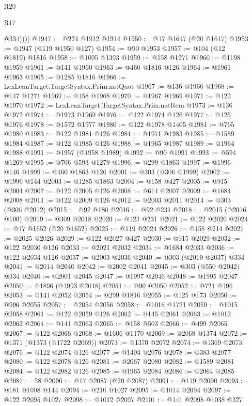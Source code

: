 \begin{lexlean}{R20}
\begin{lexlean}{R17}
\begin{coremodule}
{{{{{{{{{{{{{{{{{{{{{{{{{{{{{{{{{{{{{{{{{{{{{{{{{{{{{{{{{{{{{{{{{{{{{{{{{{{{{{{{{{{{{{{{{{{{{{{{{{{{{{{{{{{            @334))))
@1947 := @224 @1912 @1914
@1950 := @17 @1647 (@20 @1647)
@1953 := @1947 (@119 @1950 @127)
@1954 := @90 @1953
@1957 := @104 (@12 @1819) @1816
@1958 := @1005 @1393
@1959 := @158 @1271
@1960 := @1198 @1959
@1961 := @141 @1960
@1963 := @460 @1816 @126
@1964 := @1961 @1963
@1965 := @1285 @1816
@1966 := LexLeanTarget.TargetSyntax.Prim.natQuot
@1967 := @136 @1966
@1968 := @147 @1271
@1969 := @158 @1968
@1970 := @1967 @1969
@1971 := @122 @1970
@1972 := LexLeanTarget.TargetSyntax.Prim.natRem
@1973 := @136 @1972
@1974 := @1973 @1969
@1976 := @122 @1974 @126
@1977 := @125 @1976
@1978 := @1572 @1977
@1980 := @122 @1978 @1405
@1981 := @765 @1980
@1983 := @122 @1981 @126
@1984 := @1971 @1983
@1985 := @1589 @1984
@1987 := @122 @1985 @126
@1988 := @1965 @1987
@1989 := @1964 @1988
@1991 := @1957 (@1958 @1989)
@1992 := @90 @1991
@1993 := @594 @1269
@1995 := @706 @593 @1279
@1996 := @299 @1863
@1997 := @1996 @146
@1999 := @460 @1863 @126
@2001 := @303 (@306 @1999)
@2002 := @1996 @144
@2003 := @1285 @1863
@2004 := @158 @427
@2005 := @915 @2004
@2007 := @122 @2005 @126
@2008 := @614 @2007
@2009 := @1684 @2008
@2011 := @122 @2009 @126
@2012 := @2003 @2011
@2014 := @303 (@306 @2012)
@2015 := @92 @180
@2016 := @92 @231
@2018 := @2015 (@2016 @100)
@2019 := @309 @2018
@2020 := @123 @231
@2021 := @122 @2020
@2024 := @17 @1652 (@20 @1652)
@2025 := @119 @2024
@2026 := @158 @214
@2027 := @2025 @2026
@2029 := @122 @2027 @427
@2030 := @915 @2029
@2032 := @122 @2030 @126
@2033 := @2021 @2032
@2034 := @1684 @2033
@2036 := @122 @2034 @126
@2037 := @2003 @2036
@2040 := @303 (@2019 @2037) @334
@2041 := @2014 @2040
@2042 := @2002 @2041
@2045 := @303 (@550 @2042) @334
@2046 := @2001 @2045
@2047 := @1997 @2046
@2048 := @1995 @2047
@2050 := @1896 (@1993 @2048)
@2051 := @90 @2050
@2052 := @721 @196
@2053 := @141 @2052
@2054 := @299 @1816
@2055 := @125 @173
@2056 := @996 @2055
@2057 := @2054 @2056
@2058 := @1016 @1721
@2059 := @1015 @2058
@2061 := @122 @2059 @126
@2062 := @145 @2061
@2063 := @1012 @2062
@2064 := @141 @2063
@2065 := @158 @503
@2066 := @499 @2065
@2067 := @122 @2066
@2068 := @1606 @1170
@2069 := @2068 @1374
@2072 := @1371 (@1373 (@1722 @2069))
@2073 := @1370 @2072
@2074 := @1369 @2073
@2076 := @122 @2074 @126
@2077 := @1404 @2076
@2078 := @383 @2077
@2080 := @122 @2078 @126
@2081 := @2067 @2080
@2082 := @1589 @2081
@2084 := @122 @2082 @126
@2085 := @1965 @2084
@2086 := @2064 @2085
@2087 := 58
@2090 := @17 @2087 (@20 @2087)
@2091 := @119 @2090
@2093 := @181 @1008 @144
@2094 := @210 @1027
@2095 := @1014 @2094
@2097 := @122 @2095 @1027
@2098 := @1012 @2097
@2101 := @141 @2098 @1038 @327
}}}}}}}}}}}}}}}}}}}}}}}}}}}}}}}}}}}}}}}}}}}}}}}}}}}}}}}}}}}}}}}}}}}}}}}}}}}}}}}}}}}}}}}}}}}}}}}}}}}}}}}}}}}
\end{coremodule}
\end{lexlean}
\end{lexlean}
